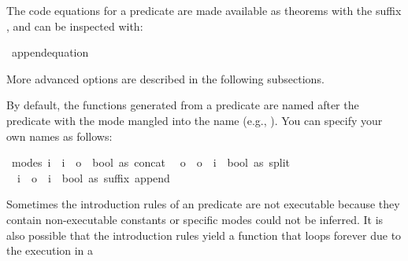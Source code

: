 \begin{isabellebody}
\begin{isamarkuptext}
  The code equations for a predicate are made available as theorems with
  the suffix , and can be inspected with:%
\end{isamarkuptext}%
\isamarkuptrue%
%
\isadelimquote
%
\endisadelimquote
%
\isatagquote
{}\isamarkupfalse%
\ append{}equation%
\endisatagquote
{\isafoldquote}%
%
\isadelimquote
%
\endisadelimquote
%
\begin{isamarkuptext}%
\noindent More advanced options are described in the following subsections.%
\end{isamarkuptext}%
\isamarkuptrue%
%
\isamarkuptrue%
%
\begin{isamarkuptext}%
By default, the functions generated from a predicate are named after
  the predicate with the mode mangled into the name (e.g., ).  You can specify your own names as follows:%
\end{isamarkuptext}%
\isamarkuptrue%
%
\isadelimquote
%
\endisadelimquote
%
\isatagquote
{}\isamarkupfalse%
\ {}modes{}\ i\ {}\ i\ {}\ o\ {}\ bool\ as\ concat{}\isanewline
\ \ o\ {}\ o\ {}\ i\ {}\ bool\ as\ split{}\isanewline
\ \ i\ {}\ o\ {}\ i\ {}\ bool\ as\ suffix{}\ append\ \isamarkupfalse%
%
\endisatagquote
{\isafoldquote}%
%
\isadelimquote
%
\endisadelimquote
%
\isamarkuptrue%
%
\begin{isamarkuptext}%
Sometimes the introduction rules of an predicate are not executable
  because they contain non-executable constants or specific modes
  could not be inferred.  It is also possible that the introduction
  rules yield a function that loops forever due to the execution in a

\end{isamarkuptext}
\end{isabellebody}

